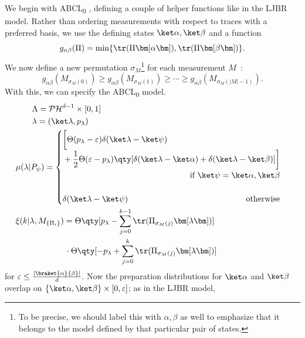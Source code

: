 \documentclass[%
 reprint,
superscriptaddress,
nofootinbib,
 amsmath,amssymb,
 prx, 
 accepted=2019-09-27,
]{quantumarticle}
\newcommand{\abclz}{{ABCL\textsubscript{0}} }
\newcommand{\proj}[1]{{\bm[}#1{\bm]}}
\begin{document}
We begin with \abclz, defining a couple of helper functions like in
the LJBR model. Rather than ordering measurements with respect to
traces with a preferred basis, we use the defining states
$\ket\alpha,\ket\beta$ and a function
\begin{equation}
  \label{eq:18}
  g_{\alpha\beta}(\Pi)=\min\{\tr(\Pi\proj\alpha),\tr(\Pi\proj\beta)\}.
\end{equation}
We now define a new permutation $\sigma_M$\footnote{To be precise, we
  should label this with $\alpha,\beta$ as well to emphasize that it
  belongs to the model defined by that particular pair of states.}
for each measurement $M$~\cite{Leiferquantumstatereal2014}:
\begin{equation}
  \label{eq:1}
  g_{\alpha\beta}(M_{\sigma_M(0)})\geq g_{\alpha\beta}(M_{\sigma_M(1)})\geq\cdots\geq g_{\alpha\beta}(M_{\sigma_M(|M|-1)}).
\end{equation}
With this, we can specify the \abclz model.
\begin{align}
  &\qquad\Lambda= \mathcal{PH}^{d-1}\times[0,1]\nonumber\\
  &\qquad\lambda= (\ket\lambda,p_\lambda)\nonumber\\
  &\mu(\lambda|P_\psi)%
    =
    \begin{cases}                          
      \begin{aligned}
        &\bigg[\Theta(p_\lambda-\varepsilon)\delta(\ket\lambda-\ket\psi)\\
        &+\frac{1}{2}\Theta(\varepsilon-p_\lambda)
        \qty[\delta(\ket\lambda-\ket\alpha)+\delta(\ket\lambda-\ket\beta)]\bigg]
      \end{aligned}\\
      \hfill\text{if }\ket\psi=\ket\alpha,\ket\beta\\\\
      \delta(\ket\lambda-\ket\psi)
      \hfill\text{otherwise}
    \end{cases}\nonumber\\
  &\xi(k|\lambda,M_{\{\Pi_i\}})= \Theta\qty[p_\lambda-\sum_{j=0}^{k-1}\tr(\Pi_{\sigma_M(j)}\proj\lambda)]\nonumber\\
                              &\qquad\qquad\qquad\cdot\Theta\qty[-p_\lambda+\sum_{j=0}^{k}\tr(\Pi_{\sigma_M(j)}\proj\lambda)]
\end{align}
for $\varepsilon\leq\frac{|\braket{\alpha}{\beta}|}{d}$. Now the
preparation distributions for $\ket\alpha$ and $\ket\beta$ overlap on
$\{\ket\alpha,\ket\beta\}\times[0,\varepsilon]$; as in the LJBR model,
\end{document}

